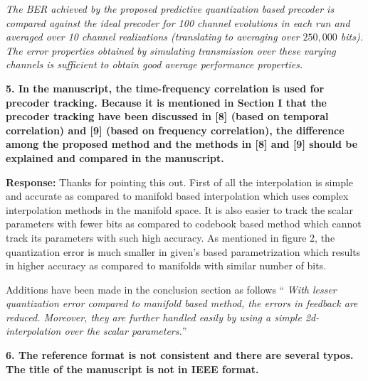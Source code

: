 \documentclass[12pt]{letter}
\begin{document}
\emph{The BER achieved by
the proposed predictive quantization based precoder is compared
against the ideal precoder for 100 channel evolutions in each run and
averaged over 10 channel realizations (translating to averaging over $250,000$ bits). The error properties obtained by simulating transmission over these varying channels is sufficient to obtain good average performance properties.}

\textbf{5. In the manuscript, the time-frequency correlation is used for precoder tracking. Because it is mentioned in Section I that the precoder tracking have been discussed in [8] (based on temporal correlation) and [9] (based on frequency correlation), the difference among the proposed method and the methods in [8] and [9] should be explained and compared in the manuscript.}

\textbf{Response:} Thanks for pointing this out.
First of all the interpolation is simple and accurate as compared to manifold based interpolation which uses complex interpolation methods in the manifold space. It is also easier to track the scalar parameters with fewer bits as compared to codebook based method which cannot track its parameters with such high accuracy. As mentioned in figure 2, the quantization error is much smaller in given's based parametrization which results in higher accuracy as compared to manifolds with similar number of bits.

Additions have been made in the conclusion section as follows `` \emph{With lesser quantization error compared to manifold based method, the 
errors in feedback are reduced. Moreover, they are further 
handled easily by using a simple 2d-interpolation over the scalar parameters.}''


\textbf{6. The reference format is not consistent and there are several typos. The title of the manuscript is not in IEEE format.}
\end{document}

